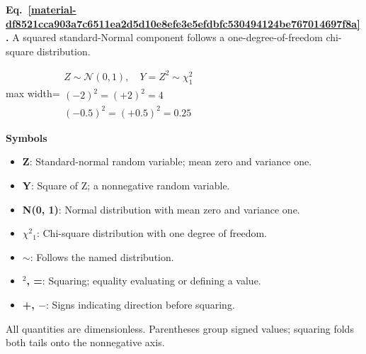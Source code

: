 \documentclass[11pt,a4paper]{article}
\begin{document}
\par\medskip
\noindent\begin{minipage}{\linewidth}
\label{material-df8521cca903a7c6511ea2d5d10e8efe3e5efdbfc530494124be767014697f8a}
\noindent\textbf{Eq.~\ref*{material-df8521cca903a7c6511ea2d5d10e8efe3e5efdbfc530494124be767014697f8a}.} A squared standard-Normal component follows a one-degree-of-freedom chi-square distribution.\par\nopagebreak
\begin{center}\begin{adjustbox}{max width=\linewidth}$\displaystyle \begin{gathered}Z\sim\mathcal N(0,1),\quad Y=Z^2\sim\chi^2_1\\(-2)^2=(+2)^2=4\\(-0.5)^2=(+0.5)^2=0.25\end{gathered}$\end{adjustbox}\end{center}

\par\noindent\textbf{Symbols}

\begin{itemize}\setlength{\itemsep}{1pt}\setlength{\parsep}{0pt}
\item \textbf{Z}: Standard-normal random variable; mean zero and variance one.
\item \textbf{Y}: Square of Z; a nonnegative random variable.
\item \textbf{N(0, 1)}: Normal distribution with mean zero and variance one.
\item \textbf{\ensuremath{\chi}\ensuremath{{}^2}\ensuremath{{}_1}}: Chi-square distribution with one degree of freedom.
\item \textbf{\ensuremath{\sim}}: Follows the named distribution.
\item \textbf{\ensuremath{{}^2}, =}: Squaring; equality evaluating or defining a value.
\item \textbf{+, \ensuremath{-}}: Signs indicating direction before squaring.
\end{itemize}

All quantities are dimensionless. Parentheses group signed values; squaring folds both tails onto the nonnegative axis.

\end{minipage}\par
\medskip
\end{document}
